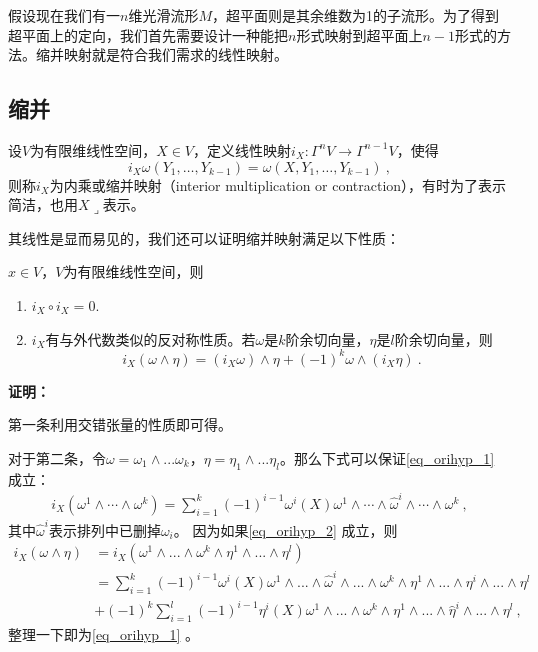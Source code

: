 

\begin{issues}
\issueTODO
\end{issues}
假设现在我们有一$n$维光滑流形$M$，超平面则是其余维数为1的子流形。为了得到超平面上的定向，我们首先需要设计一种能把$n$形式映射到超平面上$n-1$形式的方法。缩并映射就是符合我们需求的线性映射。
\subsection{缩并}
\begin{definition}{}
设$V$为有限维线性空间，$X\in V$，定义线性映射$i_X:\Gamma^n V\rightarrow\Gamma^{n-1}V$，使得
\begin{equation}
i_X\omega(Y_1,\ldots,Y_{k-1})=\omega(X,Y_1,\ldots,Y_{k-1})~,
\end{equation}
则称$i_X$为内乘或缩并映射（interior multiplication or contraction），有时为了表示简洁，也用$X\lrcorner$表示。
\end{definition}
其线性是显而易见的，我们还可以证明缩并映射满足以下性质：
\begin{lemma}{}
$x\in V$，$V$为有限维线性空间，则
\begin{enumerate}
\item $i_X\circ i_X=0$.
\item $i_X$有与外代数类似的反对称性质。若$\omega$是$k$阶余切向量，$\eta$是$l$阶余切向量，则
\begin{equation}\label{eq_orihyp_1}
i_X(\omega\wedge\eta)=(i_X\omega)\wedge\eta+(-1)^k\omega\wedge(i_X\eta)~.
\end{equation}
\end{enumerate}
\end{lemma}
\textbf{证明：}

第一条利用交错张量的性质即可得。

对于第二条，令$\omega=\omega_1\wedge...\omega_k$，$\eta=\eta_1\wedge...\eta_l$。那么下式可以保证\autoref{eq_orihyp_1} 成立：
\begin{equation}\label{eq_orihyp_2}
\begin{aligned}
i_X(\omega^1\wedge\cdots\wedge\omega^k)=\sum_{i=1}^k(-1)^{i-1}\omega^i(X)\omega^1\wedge\cdots\wedge\hat{\omega}^i\wedge\cdots\wedge\omega^k~,
\end{aligned}
\end{equation}
其中$\hat\omega^i$表示排列中已删掉$\omega_i$。
因为如果\autoref{eq_orihyp_2} 成立，则
\begin{equation}
\begin{aligned}
i_X(\omega\wedge\eta)&=i_X(\omega^1\wedge...\wedge\omega^k\wedge\eta^1\wedge...\wedge\eta^l)\\
&=\sum_{i=1}^k(-1)^{i-1}\omega^{i}(X)\omega^1\wedge...\wedge\hat\omega^i\wedge...\wedge\omega^k\wedge\eta^1\wedge...\wedge\eta^i\wedge...\wedge\eta^l\\
&+(-1)^k\sum_{i=1}^l(-1)^{i-1}\eta^{i}(X)\omega^1\wedge...\wedge\omega^k\wedge\eta^1\wedge...\wedge\hat\eta^i\wedge...\wedge\eta^l~,
\end{aligned}
\end{equation}
整理一下即为\autoref{eq_orihyp_1} 。

